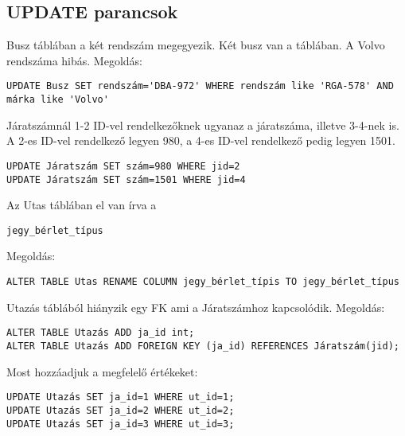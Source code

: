 \documentclass[12pt]{article}
\begin{document}
\subsection{UPDATE parancsok}
Busz táblában a két rendszám megegyezik. Két busz van a táblában. A Volvo rendszáma hibás. Megoldás:
\begin{verbatim}
UPDATE Busz SET rendszám='DBA-972' WHERE rendszám like 'RGA-578' AND márka like 'Volvo'
\end{verbatim}
Járatszámnál 1-2 ID-vel rendelkezőknek ugyanaz a járatszáma, illetve 3-4-nek is. A 2-es ID-vel rendelkező legyen 980, a 4-es ID-vel rendelkező pedig legyen 1501.
\begin{verbatim}
UPDATE Járatszám SET szám=980 WHERE jid=2
UPDATE Járatszám SET szám=1501 WHERE jid=4
\end{verbatim}
Az Utas táblában el van írva a 
\begin{verbatim}jegy_bérlet_típus\end{verbatim}
Megoldás:
\begin{verbatim}
ALTER TABLE Utas RENAME COLUMN jegy_bérlet_típis TO jegy_bérlet_típus
\end{verbatim}
Utazás táblából hiányzik egy FK ami a Járatszámhoz kapcsolódik. Megoldás:
\begin{verbatim}
ALTER TABLE Utazás ADD ja_id int;
ALTER TABLE Utazás ADD FOREIGN KEY (ja_id) REFERENCES Járatszám(jid);
\end{verbatim}
Most hozzáadjuk a megfelelő értékeket:
\begin{verbatim}
UPDATE Utazás SET ja_id=1 WHERE ut_id=1;
UPDATE Utazás SET ja_id=2 WHERE ut_id=2;
UPDATE Utazás SET ja_id=3 WHERE ut_id=3;
\end{verbatim}
\newpage
\end{document}
